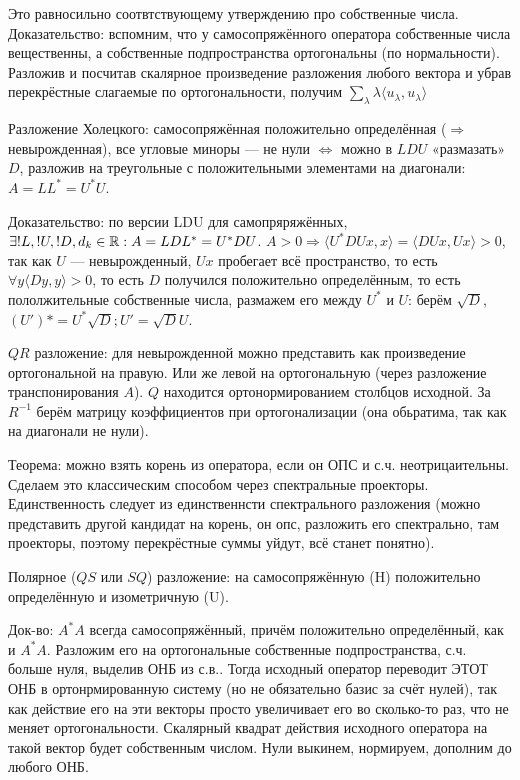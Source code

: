 \documentclass[12pt, a4paper]{article}
\begin{document}
Это равносильно соотвтствующему утверждению про собственные числа. Доказательство: вспомним, что у самосопряжённого оператора 
собственные числа вещественны, а собственные подпространства ортогональны (по нормальности). 
Разложив и посчитав скалярное произведение разложения любого вектора и убрав перекрёстные слагаемые по ортогональности, получим $\sum_\lambda \lambda \langle u_\lambda, u_\lambda \rangle$




Разложение Холецкого: самосопряжённая положительно определённая ($\Rightarrow$ невырожденная), все угловые миноры — не нули 
$\Longleftrightarrow$ можно в $LDU$ «размазать» $D$, 
разложив на треугольные с положительными элементами на диагонали: $A = LL^* = U^*U$.

Доказательство: по версии LDU для самопряряжённых, $\exists !L, !U, !D, d_k \in {\mathbb{R}}: A = LDL^* = U^*DU$.
$A > 0 \Rightarrow \langle U^*DU x, x \rangle = \langle DU x, U x \rangle > 0$, так как $U$ — невырожденный, $Ux$ пробегает всё пространство, то есть
$\forall y \langle D y, y \rangle > 0$, то есть $D$ получился положительно определённым, то есть пололжительные собственные числа, размажем его между $U^*$ и $U$: 
берём $\sqrt{D}$, $(U')* = U^* \sqrt{D} ; U' = \sqrt{D} U$.



$QR$ разложение: для невырожденной можно представить как произведение ортогональной на правую. Или же левой на ортогональную (через разложение транспонирования $A$).
$Q$ находится ортонормированием столбцов исходной. За $R^{-1}$ берём матрицу коэффициентов при ортогонализации (она обьратима, так как на диагонали не нули).

Теорема: можно взять корень из оператора, если он ОПС и с.ч. неотрицаительны. Сделаем это классическим способом через спектральные проекторы. 
Единственность следует из единственнсти спектрального разложения 
(можно представить другой кандидат на корень, он опс, разложить его спектрально, там проекторы, поэтому перекрёстные суммы уйдут, всё станет понятно).

Полярное ($QS$ или $SQ$) разложение: на самосопряжённую (H) положительно определённую и изометричную (U).

Док-во: $A^*A$ всегда самосопряжённый, причём положительно определённый, как и $A^*A$. Разложим его на ортогональные собственные подпространства, с.ч. больше нуля, выделив ОНБ из с.в..
Тогда исходный оператор переводит ЭТОТ ОНБ в ортонрмированную систему (но не обязательно базис за счёт нулей), так как действие его на эти векторы просто увеличивает его во сколько-то раз, что не меняет ортогональности.
Скалярный квадрат действия исходного оператора на такой вектор будет собственным числом. Нули выкинем, нормируем, дополним до любого ОНБ.
\end{document}
